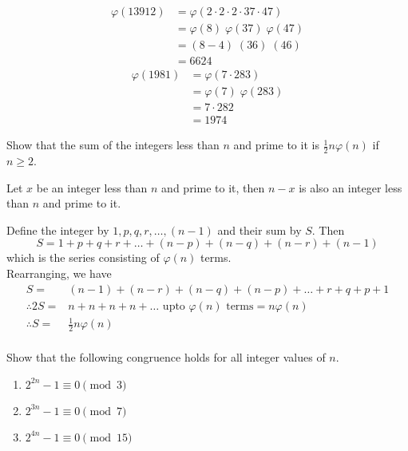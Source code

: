 \documentclass[12pt,class=book,crop=false]{standalone}
\begin{document}
\begin{soln}
\begin{align*}
        \varphi(13912) & =\varphi(2\cdot 2\cdot2\cdot37\cdot47)                       \\
                       & =\varphi\left( 8\right)\;\varphi\left(37\right)\;\varphi(47) \\
                       & =\left( 8-4\right)\;\left(36\right)\;(46)                    \\
                       & =6624
    \end{align*}
    \begin{align*}
        \varphi(1981) & =\varphi(7\cdot 283)                             \\
                      & =\varphi\left( 7\right)\;\varphi\left(283\right) \\
                      & =7\cdot282                                       \\
                      & =1974
    \end{align*}
\end{soln}
\begin{qn}
    Show that the sum of the integers less than $ n $ and prime to it is $ \frac{1}{2}n \varphi(n) $ if $ n\geq 2 $.
\end{qn}
\begin{soln}
    Let $ x $ be an integer less than $ n $ and prime to it, then $ n-x $ is also an integer less than $ n $ and prime to it.

    Define the integer by $ 1,p,q,r,\dots,(n-1) $ and their sum by $ S $. Then
    \[S=1+p+q+r+\dots+(n-p)+(n-q)+(n-r)+(n-1)\]
    which is the series consisting of $ \varphi(n) $ terms.\\
    Rearranging, we have
    \begin{align*}
        S=             & (n-1)+(n-r)+(n-q)+(n-p)+\dots+r+q+p+1                            \\
        \therefore 2S= & n+n+n+n+\dots \text{ upto } \varphi(n)\text{ terms} =n\varphi(n) \\
        \therefore S=  & \frac{1}{2}n\varphi(n)                                           \\
    \end{align*}
\end{soln}
\begin{qn}
    Show that the following congruence holds for all integer values of $ n $.
    \begin{enumerate}[label=(\roman*)]
        \item $ 2^{2n}-1\equiv 0 \pmod{3} $
        \item $ 2^{3n}-1\equiv 0 \pmod{7} $
        \item $ 2^{4n}-1\equiv 0 \pmod{15} $
    \end{enumerate}
\end{qn}
\end{document}
